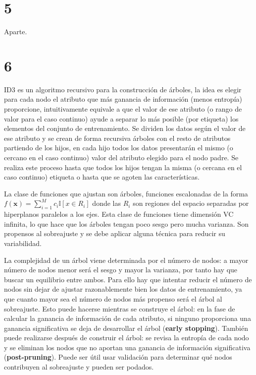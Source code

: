 \documentclass{article}
\begin{document}
\section{5}

Aparte.

\section{6}

ID3 es un algoritmo recursivo para la construcción de árboles, la idea
es elegir para cada nodo el atributo que más ganancia de información
(menos entropía) proporcione, intuitivamente equivale a que el valor
de ese atributo (o rango de valor para el caso continuo) ayude a
separar lo más posible (por etiqueta) los elementos del conjunto de
entrenamiento. Se dividen los datos según el valor de ese atributo y
se crean de forma recursiva árboles con el resto de atributos
partiendo de los hijos, en cada hijo todos los datos presentarán el
mismo (o cercano en el caso continuo) valor del atributo elegido para
el nodo padre. Se realiza este proceso hasta que todos los hijos
tengan la misma (o cercana en el caso continuo) etiqueta o hasta que
se agoten las características.

La clase de funciones que ajustan son árboles, funciones escalonadas
de la forma
\( f(\textbf{x})=\sum\limits_{i=1}^M c_i \mathbb{I}[x\in R_i] \) donde
las \(R_i\) son regiones del espacio separadas por hiperplanos
paralelos a los ejes. Esta clase de funciones tiene dimensión VC
infinita, lo que hace que los árboles tengan poco sesgo pero mucha
varianza. Son propensos al sobreajuste y se debe aplicar alguna
técnica para reducir su variabilidad.

La complejidad de un árbol viene determinada por el número de nodos: a
mayor número de nodos menor será el sesgo y mayor la varianza, por
tanto hay que buscar un equilibrio entre ambos. Para ello hay que
intentar reducir el número de nodos sin dejar de ajustar
razonablemente bien los datos de entrenamiento, ya que cuanto mayor
sea el número de nodos más propenso será el árbol al sobreajuste. Esto
puede hacerse mientras se construye el árbol: en la fase de calcular
la ganancia de información de cada atributo, si ninguno proporciona
una ganancia significativa se deja de desarrollar el árbol
(\textbf{early stopping}). También puede realizarse después de
construir el árbol: se revisa la entropía de cada nodo y se eliminan
los nodos que no aportan una ganancia de información significativa
(\textbf{post-pruning}). Puede ser útil usar validación para
determinar qué nodos contribuyen al sobreajuste y pueden ser podados.
\end{document}
